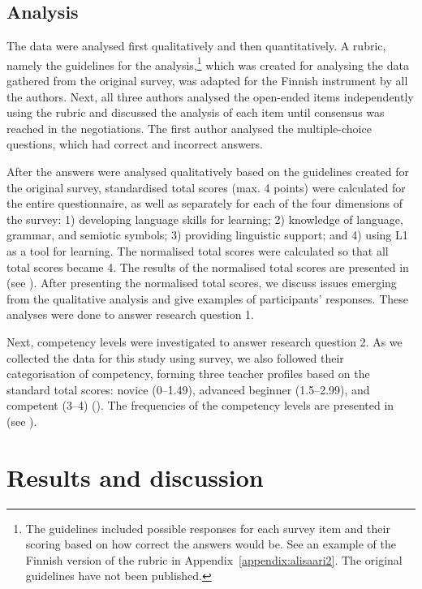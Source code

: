 \documentclass[output=paper]{langscibook}
\begin{document}
\subsection{Analysis}\label{sec:alisaari:3.3} %
\begin{sloppypar}
The data were analysed first qualitatively and then quantitatively. A rubric, namely the guidelines for the analysis,\footnote{The guidelines included possible responses for each survey item and their scoring based on how correct the answers would be. See an example of the Finnish version of the rubric in Appendix~\ref{appendix:alisaari2}. The original guidelines have not been published.} which was created for analysing the data gathered from the original survey, was adapted for the Finnish instrument by all the authors. Next, all three authors analysed the open-ended items independently using the rubric and discussed the analysis of each item until consensus was reached in the negotiations. The first author analysed the multiple-choice questions, which had correct and incorrect answers. 
\end{sloppypar}

After the answers were analysed qualitatively based on the guidelines created for the original survey, standardised total scores (max. 4 points) were calculated for the entire questionnaire, as well as separately for each of the four dimensions of the survey: 1) developing language skills for learning; 2) knowledge of language, grammar, and semiotic symbols; 3) providing linguistic support; and 4) using L1 as a tool for learning. The normalised total scores were calculated so that all total scores became 4. The results of the normalised total scores are presented in  (see ). After presenting the normalised total scores, we discuss issues emerging from the qualitative analysis and give examples of participants’ responses. These analyses were done to answer research question 1.

Next, competency levels were investigated to answer research question 2. As we collected the data for this study using  survey, we also followed their categorisation of competency, forming three teacher profiles based on the standard total scores: novice (0–1.49), advanced beginner (1.5–2.99), and competent (3–4) (\citealt{DreyfusDreyfus1986}). The frequencies of the competency levels are presented in  (see ).

\section{Results and discussion}\label{sec:alisaari:4}
\end{document}
